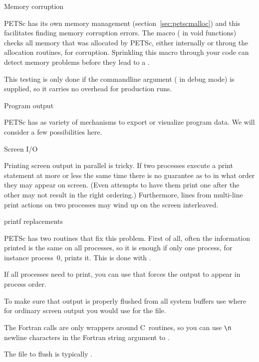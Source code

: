  {Memory corruption}
\label{sec:petsc-mem}

PETSc has its own memory management (section~\ref{sec:petscmalloc})
and this facilitates finding memory corruption errors.
The macro  ( in void functions)
checks all memory that was allocated by PETSc,
either internally or throug the allocation routines,
for corruption. Sprinkling this macro through your code
can detect memory problems before they lead to a .

This testing is only done if the commandline argument
 ( in debug mode)
is supplied, so it carries no overhead for production runs.

 {Program output}

PETSc has as variety of mechanisms to export or visualize program data.
We will consider a few possibilities here.

 {Screen I/O}

Printing screen output in parallel is tricky. If two processes execute
a print statement at more or less the same time there is no guarantee
as to in what order they may appear on screen. (Even attempts to have
them print one after the other may not result in the right ordering.)
Furthermore, lines from multi-line print actions on two processes may
wind up on the screen interleaved.

 {printf replacements}

PETSc has two routines that fix this problem. First of all, often the
information printed is the same on all processes, so it is enough if
only one process, for instance process~0, prints it. This is done with
.

If all processes need to print, you can use
 that forces the
output to appear in process order.

To make sure that output is properly flushed from all system buffers
use 
where for ordinary screen output you would use  for the file.

\begin{fortrannote}
  The Fortran calls are only wrappers around C~routines, so you can 
  use \verb+\n+ newline characters in the Fortran string argument
  to .

  The file to flush is typically .
\end{fortrannote}

